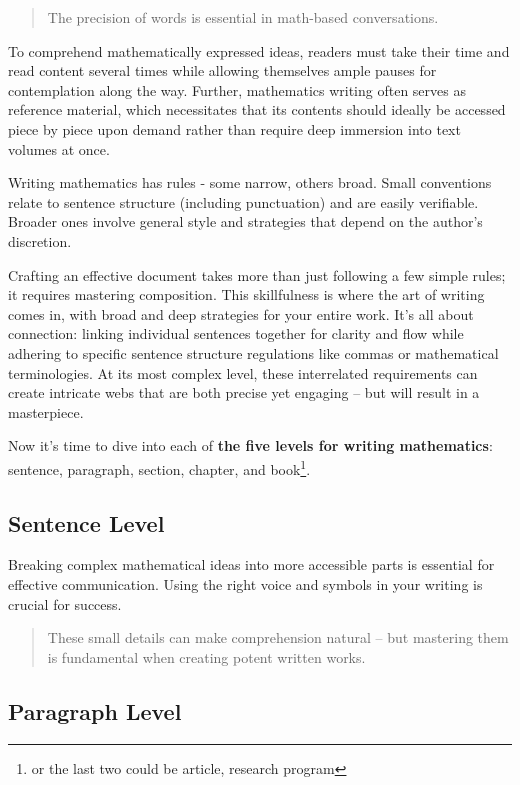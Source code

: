 \documentclass[
  twoside,
  12pt,
  letterpaper,
  fleqn]{article}
\begin{document}
\begin{quote}
The precision of words is essential in math-based conversations.
\end{quote}

To comprehend mathematically expressed ideas, readers must take their
time and read content several times while allowing themselves ample
pauses for contemplation along the way. Further, mathematics writing
often serves as reference material, which necessitates that its contents
should ideally be accessed piece by piece upon demand rather than
require deep immersion into text volumes at once.

Writing mathematics has rules - some narrow, others broad. Small
conventions relate to sentence structure (including punctuation) and are
easily verifiable. Broader ones involve general style and strategies
that depend on the author's discretion.

Crafting an effective document takes more than just following a few
simple rules; it requires mastering composition. This skillfulness is
where the art of writing comes in, with broad and deep strategies for
your entire work. It's all about connection: linking individual
sentences together for clarity and flow while adhering to specific
sentence structure regulations like commas or mathematical
terminologies. At its most complex level, these interrelated
requirements can create intricate webs that are both precise yet
engaging -- but will result in a masterpiece.

Now it's time to dive into each of \textbf{the five levels for writing
mathematics}: sentence, paragraph, section, chapter, and
book\footnote{or the last two could be article, research program}.

\hypertarget{sentence-level}{%
\subsection{Sentence Level}\label{sentence-level}}

Breaking complex mathematical ideas into more accessible parts is
essential for effective communication. Using the right voice and symbols
in your writing is crucial for success.

\begin{quote}
These small details can make comprehension natural -- but mastering them
is fundamental when creating potent written works.
\end{quote}

\hypertarget{paragraph-level}{%
\subsection{Paragraph Level}\label{paragraph-level}}
\end{document}
